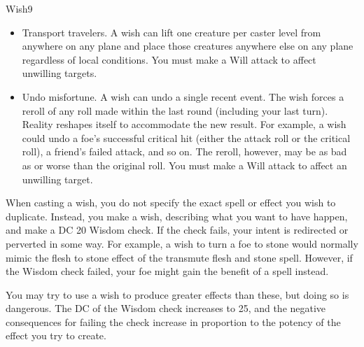\begin{spellfooter}
\begin{spellsection}{Wish}{9}
\begin{spellcontent}
\begin{itemize}
            \item Transport travelers. A wish can lift one creature per caster level from anywhere on any plane and place those creatures anywhere else on any plane regardless of local conditions. You must make a Will attack to affect unwilling targets.
            \item Undo misfortune. A wish can undo a single recent event. The wish forces a reroll of any roll made within the last round (including your last turn). Reality reshapes itself to accommodate the new result. For example, a wish could undo a foe's successful critical hit (either the attack roll or the critical roll), a friend's failed attack, and so on. The reroll, however, may be as bad as or worse than the original roll. You must make a Will attack to affect an unwilling target.
        \end{itemize}
        \par When casting a wish, you do not specify the exact spell or effect you wish to duplicate. Instead, you make a wish, describing what you want to have happen, and make a DC 20 Wisdom check. If the check fails, your intent is redirected or perverted in some way. For example, a wish to turn a foe to stone would normally mimic the flesh to stone effect of the transmute flesh and stone spell. However, if the Wisdom check failed, your foe might gain the benefit of a  spell instead.
        \par You may try to use a wish to produce greater effects than these, but doing so is dangerous. The DC of the Wisdom check increases to 25, and the negative consequences for failing the check increase in proportion to the potency of the effect you try to create.
    \end{spellcontent}
\end{spellsection}


\end{spellfooter}
